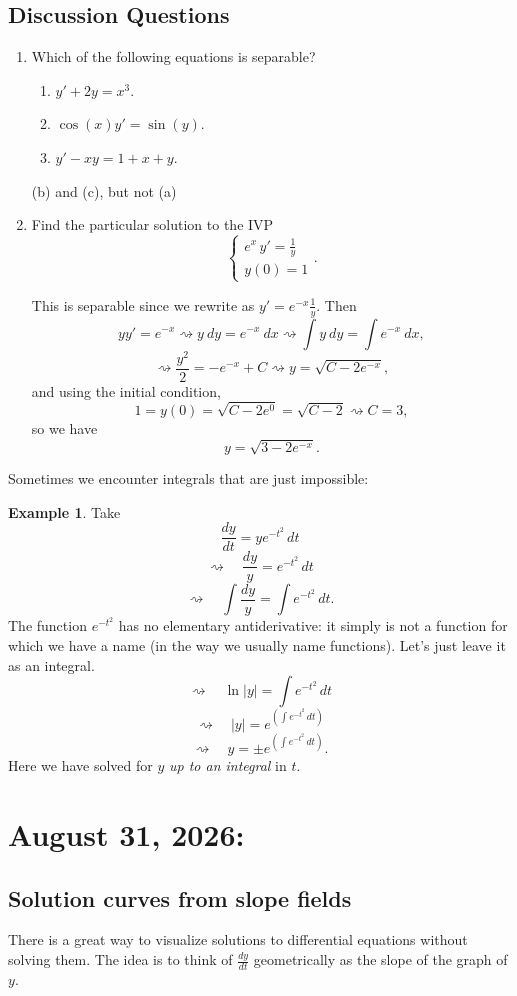 \documentclass[12pt]{amsart}
\numberwithin{equation}{section}
\theoremstyle{plain} %
\newcommand{\aug}[2]{\section{August #1, 2026: \textsection{#2}}}
\newcommand{\rsa}{\rightsquigarrow}
\theoremstyle{definition}
\newtheorem{ex}[equation]{Example}
\theoremstyle{remark}
\begin{document}
\subsection*{Discussion Questions}
\begin{enumerate}
\item Which of the following equations is separable?
\begin{enumerate}
\item $y' + 2y = x^3$.
\item $\cos(x) y' = \sin(y)$.
\item $y' - xy = 1+x+y$.
\end{enumerate}
\begin{framed}
(b) and (c), but not (a)
\end{framed}
\item Find the particular solution to the IVP
\[ \begin{cases} 
e^{x} \, y' = \frac{1}{y} \\
y(0) = 1\end{cases}.\]
\begin{framed}
This is separable since we rewrite as $y' = e^{-x} \frac{1}{y}$. Then
\[ y y' = e^{-x} \rsa y  \ dy = e^{-x} \ dx \rsa \int  y  \ dy = \int e^{-x} \ dx,\]
\[ \rsa \frac{y^2}{2} = -e^{-x} + C \rsa y = \sqrt{C - 2 e^{-x}},\]
and using the initial condition,
\[ 1 = y(0) = \sqrt{C - 2 e^{0}} = \sqrt{C-2} \rsa C=3,\]
so we have
\[ y = \sqrt{3 - 2 e^{-x}}.\]
\end{framed}
\end{enumerate}

Sometimes we encounter integrals that are just impossible:

\begin{ex} Take 
\[ \frac{dy}{dt} = y e^{-t^2} \, dt\]
\[\rsa\quad \frac{dy}{y} = e^{-t^2} \, dt\]
\[\rsa\quad \int \frac{dy}{y} = \int e^{-t^2} \, dt.\]
The function $e^{-t^2}$ has no elementary antiderivative: it simply is not a function for which we have a name (in the way we usually name functions). Let's just leave it as an integral.
\[\rsa\quad \ln |y| = \int e^{-t^2} \, dt\]
\[\rsa\quad |y| = e^{\left(\int e^{-t^2} \, dt\right)}\]
\[\rsa\quad y =  \pm e^{\left(\int e^{-t^2} \, dt\right)}.\]
Here we have solved for $y$ \emph{up to an integral} in $t$.
\end{ex}



\aug{31}{1.3}


\subsection*{Solution curves from slope fields} There is a great way to visualize solutions to differential equations without solving them. The idea is to think of $\frac{dy}{dt}$ geometrically as the slope of the graph of $y$.
\end{document}
